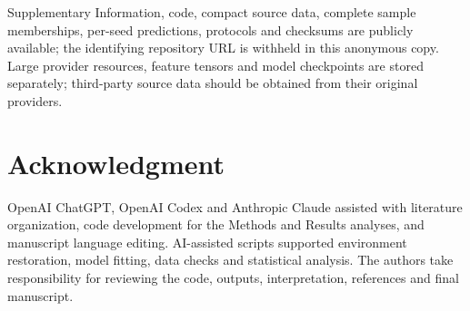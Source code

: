 \documentclass[conference]{IEEEtran}
\begin{document}
Supplementary Information, code, compact source data, complete sample memberships, per-seed predictions, protocols and checksums are publicly available; the identifying repository URL is withheld in this anonymous copy. Large provider resources, feature tensors and model checkpoints are stored separately; third-party source data should be obtained from their original providers.

\section*{Acknowledgment}

OpenAI ChatGPT, OpenAI Codex and Anthropic Claude assisted with literature organization, code development for the Methods and Results analyses, and manuscript language editing. AI-assisted scripts supported environment restoration, model fitting, data checks and statistical analysis. The authors take responsibility for reviewing the code, outputs, interpretation, references and final manuscript.
\end{document}

